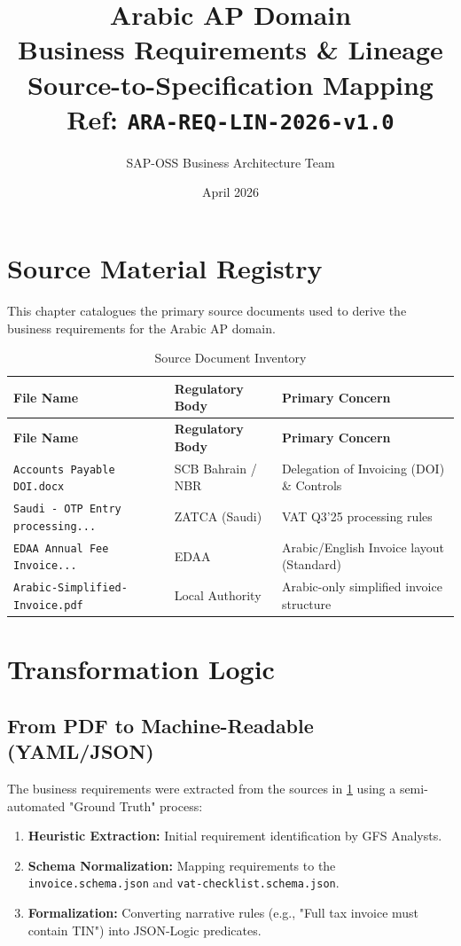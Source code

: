 \documentclass[11pt,a4paper,twoside]{report}
\begin{document}
\title{\Huge Arabic AP Domain \\
       \textbf{Business Requirements \& Lineage} \\
       \large Source-to-Specification Mapping \\
       \small Ref: \texttt{ARA-REQ-LIN-2026-v1.0}}
\author{SAP-OSS Business Architecture Team}
\date{April 2026}

\maketitle

\chapter{Source Material Registry}
\label{ch:source-registry}

This chapter catalogues the primary source documents used to derive the business requirements for the Arabic AP domain.

\begin{longtable}{p{5cm} p{3cm} p{6cm}}
\caption{Source Document Inventory} \\
\toprule
\textbf{File Name} & \textbf{Regulatory Body} & \textbf{Primary Concern} \\
\midrule
\endfirsthead
\toprule
\textbf{File Name} & \textbf{Regulatory Body} & \textbf{Primary Concern} \\
\midrule
\endhead
\texttt{Accounts Payable DOI.docx} & SCB Bahrain / NBR & Delegation of Invoicing (DOI) \& Controls \\
\texttt{Saudi - OTP Entry processing...} & ZATCA (Saudi) & VAT Q3'25 processing rules \\
\texttt{EDAA Annual Fee Invoice...} & EDAA & Arabic/English Invoice layout (Standard) \\
\texttt{Arabic-Simplified-Invoice.pdf} & Local Authority & Arabic-only simplified invoice structure \\
\bottomrule
\end{longtable}

\chapter{Transformation Logic}
\label{ch:transformation}

\section{From PDF to Machine-Readable (YAML/JSON)}
The business requirements were extracted from the sources in \cref{ch:source-registry} using a semi-automated "Ground Truth" process:
\begin{enumerate}
    \item \textbf{Heuristic Extraction:} Initial requirement identification by GFS Analysts.
    \item \textbf{Schema Normalization:} Mapping requirements to the \texttt{invoice.schema.json} and \texttt{vat-checklist.schema.json}.
    \item \textbf{Formalization:} Converting narrative rules (e.g., "Full tax invoice must contain TIN") into JSON-Logic predicates.
\end{enumerate}
\end{document}
